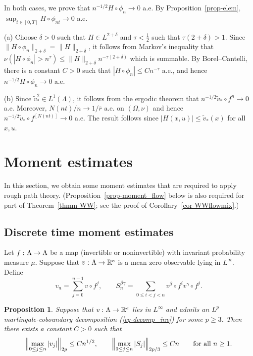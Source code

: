 \documentclass[aop,MSNbibl,seceqn,dvips]{arximspdf}
\newcommand{\eqref}[1]{(\ref{#1})}
\newtheorem{prop}[thmm]{Proposition}
\newcommand{\R}{\mathbb{R}}
\newcommand{\tildev}{\tilde{v}}
\begin{document}
\begin{pf}
In both cases, we prove that
$n^{-1/2}H\circ\phi_n\to0$ a.e. By Proposition~\ref{prop-elem},
$\sup_{t\in[0,T]}H\circ\phi_{nt}\to0$ a.e.

(a) Choose $\delta>0$ such that $H\in L^{2+\delta}$ and $\tau
<\frac{1}2$ such that
\mbox{$\tau(2+\delta)>1$}.
Since $\|H\circ\phi_n\|_{2+\delta}=\|H\|_{2+\delta}$, it follows from
Markov's inequality that $\nu(|H\circ\phi_n|>n^\tau)\le\|H\|
_{2+\delta
}n^{-\tau(2+\delta)}$ which is summable.
By Borel--Cantelli, there is a constant $C>0$ such that
$|H\circ\phi_n|\le Cn^{-\tau}$ a.e., and hence $n^{-1/2}H\circ\phi
_n\to
0$ a.e.

(b)
Since $\tildev_*^2\in L^1(\Lambda)$, it follows from the ergodic
theorem that
$n^{-1/2}\tildev_*\circ f^n\to0$ a.e.
Moreover, $N(nt)/n\to1/\bar r$ a.e.
on $(\Omega,\nu)$ and hence
$n^{-1/2}\tildev_*\circ f^{[N(nt)]}\to0$ a.e.
The result follows since $|H(x,u)|\le\tildev_*(x)$ for all $x,u$.
\end{pf}


\section{Moment estimates}
\label{sec-moment}

In this section, we obtain some moment estimates that are required to
apply rough path theory.
(Proposition~\ref{prop-moment_flow} below is also required for part of
Theorem~\ref{thmm-WW}; see the proof of Corollary~\ref{cor-WWflowmix}.)

\subsection{Discrete time moment estimates}

Let $f\dvtx\Lambda\to\Lambda$ be a map (invertible or
noninvertible) with
invariant probability measure $\mu$.
Suppose that
$v\dvtx\Lambda\to\R^e$ is a mean zero observable lying in $L^\infty$.
Define
%
\[
v_n=\sum_{j=0}^{n-1}v\circ
f^j,\qquad S_n^{\beta\gamma}= \sum
_{0\le i<j<n}v^\beta\circ f^i
v^\gamma\circ f^j.
\]

\begin{prop} \label{prop-moment}
Suppose that $v\dvtx\Lambda\to\R^e$ lies in $L^\infty$ and admits
an $L^p$
martingale-coboundary decomposition \eqref{eq-decomp_inv} for some
$p\ge3$.
Then there exists a constant $C>0$ such that
%
\[
\Bigl\|\max_{0\le j\le n}|v_j| \Bigr\|_{2p}\le
Cn^{1/2}, \qquad\Bigl\| \max_{0\le j\le n}|S_j|
\Bigr\|_{2p/3} \le Cn \qquad\mbox{for all $n\ge1$.}
\]
%
\end{prop}
\end{document}
